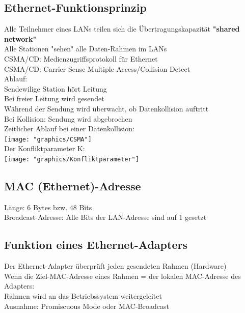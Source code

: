 \documentclass{scrreprt}
\begin{document}
\subsection{Ethernet-Funktionsprinzip}
Alle Teilnehmer eines LANs teilen sich die Übertragungskapazität \textbf{"shared network"}
\\Alle Stationen "sehen" alle Daten-Rahmen im LANs
\\CSMA/CD: Medienzugriffsprotokoll für Ethernet
\\\tab CSMA/CD: Carrier Sense Multiple Access/Collision Detect
\\\tab Ablauf:
\\\tab[2cm] Sendewilige Station hört Leitung
\\\tab[2cm] Bei freier Leitung wird gesendet
\\\tab[2cm] Während der Sendung wird überwacht, ob Datenkollision auftritt
\\\tab[2cm] Bei Kollision: Sendung wird abgebrochen
\\Zeitlicher Ablauf bei einer Datenkollision:
\\\texttt{[image: "graphics/CSMA"]}
\\Der Konfliktparameter K:
\\\texttt{[image: "graphics/Konfliktparameter"]}
\subsection{MAC (Ethernet)-Adresse}
Länge: 6 Bytes bzw. 48 Bits
\\Broadcast-Adresse: Alle Bits der LAN-Adresse sind auf 1 gesetzt
\subsection{Funktion eines Ethernet-Adapters}
Der Ethernet-Adapter überprüft jeden gesendeten Rahmen (Hardware)
\\Wenn die Ziel-MAC-Adresse eines Rahmen = der lokalen MAC-Adresse des Adapters:
\\\tab Rahmen wird an das Betriebssystem weitergeleitet 
\\\tab Ausnahme: Promiscuous Mode oder MAC-Broadcast
\end{document}
